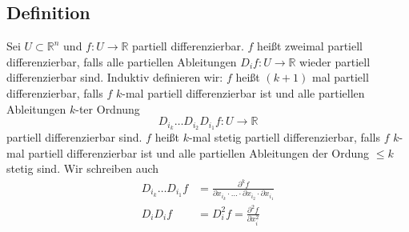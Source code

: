 \subsection[Definition: $k$-mal partiell differenzierbar]{Definition} %
\label{sub:65}
Sei $U \subset \mathds{R}^n$ und $f : U \to \mathds{R}$ partiell differenzierbar. $f$ heißt zweimal partiell differenzierbar, falls alle partiellen Ableitungen 
$D_i f : U \to \mathds{R}$ wieder partiell differenzierbar sind. Induktiv definieren wir: $f$ heißt $(k+1)$ mal partiell differenzierbar, falls $f$ $k$-mal partiell
differenzierbar ist und alle partiellen Ableitungen $k$-ter Ordnung 
\[
	D_{i_k} \ldots D_{i_2}D_{i_1} f : U \to \mathds{R}
\]
partiell differenzierbar sind. $f$ heißt $k$-mal stetig partiell differenzierbar, falls $f$ $k$-mal partiell differenzierbar ist und alle partiellen Ableitungen der 
Ordung $\le k$ stetig sind. Wir schreiben auch 
\begin{align*}
	D_{i_k} \ldots D_{i_1} f &= \frac{\partial^k f}{\partial x_{i_k} \cdot \ldots  \cdot \partial x_{i_2} \cdot \partial x_{i_1}}  \\
	D_i D_i f &= D_i^2 f = \frac{\partial^2 f}{\partial x_i^2} 
\end{align*}

